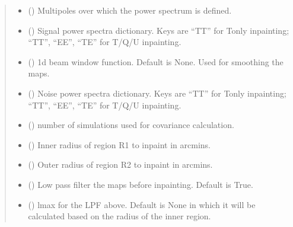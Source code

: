 \documentclass[letterpaper,10pt,english]{sphinxmanual}
\begin{document}
\begin{fulllineitems}
\begin{quote}
\begin{description}
\begin{itemize}
\item {} 
\sphinxAtStartPar
{} () \textendash{} Multipoles over which the power spectrum is defined.

\item {} 
\sphinxAtStartPar
{} () \textendash{} Signal power spectra dictionary.
Keys are “TT” for T\sphinxhyphen{}only inpainting;
“TT”, “EE”, “TE” for T/Q/U inpainting.

\item {} 
\sphinxAtStartPar
{} () \textendash{} 1d beam window function.
Default is None. Used for smoothing the maps.

\item {} 
\sphinxAtStartPar
{} () \textendash{} Noise power spectra dictionary.
Keys are “TT” for T\sphinxhyphen{}only inpainting;
“TT”, “EE”, “TE” for T/Q/U inpainting.

\item {} 
\sphinxAtStartPar
{} () \textendash{} number of simulations used for covariance calculation.

\item {} 
\sphinxAtStartPar
{} () \textendash{} Inner radius of region R1 to inpaint in arcmins.

\item {} 
\sphinxAtStartPar
{} () \textendash{} Outer radius of region R2 to inpaint in arcmins.

\item {} 
\sphinxAtStartPar
{} () \textendash{} Low pass filter the maps before inpainting.
Default is True.

\item {} 
\sphinxAtStartPar
{} () \textendash{} lmax for the LPF above.
Default is None in which it will be calculated based on the radius of the inner region.


\end{itemize}
\end{description}
\end{quote}
\end{fulllineitems}
\end{document}
